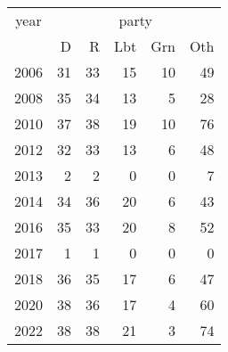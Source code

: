 \footnotesize\begin{tabular}[t]{lrrrrr}
\toprule
\multicolumn{1}{c}{year} & \multicolumn{5}{c}{party} \\
\cmidrule(l{3pt}r{3pt}){1-1} \cmidrule(l{3pt}r{3pt}){2-6}
  & D & R & Lbt & Grn & Oth\\
\midrule
2006 & 31 & 33 & 15 & 10 & 49\\
2008 & 35 & 34 & 13 & 5 & 28\\
2010 & 37 & 38 & 19 & 10 & 76\\
2012 & 32 & 33 & 13 & 6 & 48\\
2013 & 2 & 2 & 0 & 0 & 7\\
2014 & 34 & 36 & 20 & 6 & 43\\
2016 & 35 & 33 & 20 & 8 & 52\\
2017 & 1 & 1 & 0 & 0 & 0\\
2018 & 36 & 35 & 17 & 6 & 47\\
2020 & 38 & 36 & 17 & 4 & 60\\
2022 & 38 & 38 & 21 & 3 & 74\\
\bottomrule
\end{tabular}

